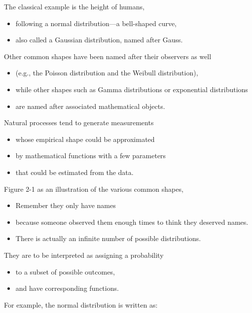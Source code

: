 \documentclass[]{article}
\providecommand{\tightlist}{%
  \setlength{\itemsep}{0pt}\setlength{\parskip}{0pt}}
\begin{document}
The classical example is the height of humans,

\begin{itemize}
\tightlist
\item
  following a normal distribution---a bell-shaped curve,
\item
  also called a Gaussian distribution, named after Gauss.
\end{itemize}

Other common shapes have been named after their observers as well

\begin{itemize}
\tightlist
\item
  (e.g., the Poisson distribution and the Weibull distribution),
\item
  while other shapes such as Gamma distributions or exponential
  distributions
\item
  are named after associated mathematical objects.
\end{itemize}

Natural processes tend to generate measurements

\begin{itemize}
\tightlist
\item
  whose empirical shape could be approximated
\item
  by mathematical functions with a few parameters
\item
  that could be estimated from the data.
\end{itemize}

Figure 2-1 as an illustration of the various common shapes,

\begin{itemize}
\tightlist
\item
  Remember they only have names
\item
  because someone observed them enough times to think they deserved
  names.
\item
  There is actually an infinite number of possible distributions.
\end{itemize}

They are to be interpreted as assigning a probability

\begin{itemize}
\tightlist
\item
  to a subset of possible outcomes,
\item
  and have corresponding functions.
\end{itemize}

For example, the normal distribution is written as:
\end{document}
